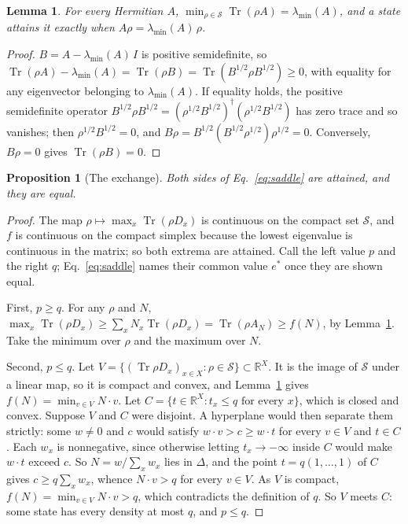 \documentclass[aps,prd,reprint,superscriptaddress]{revtex4-2}
\newtheorem{proposition}{Proposition}
\newtheorem{lemma}{Lemma}
\begin{document}
\begin{lemma}\label{lem:lowest}
For every Hermitian $A$, $\min_{\rho\in\mathcal S}\operatorname{Tr}(\rho A) = \lambda_{\min}(A)$, and a state attains it exactly when $A\rho = \lambda_{\min}(A)\,\rho$.
\end{lemma}
\begin{proof}
$B = A - \lambda_{\min}(A)\,I$ is positive semidefinite, so $\operatorname{Tr}(\rho A) - \lambda_{\min}(A) = \operatorname{Tr}(\rho B) = \operatorname{Tr}(B^{1/2}\rho B^{1/2}) \ge 0$, with equality for any eigenvector belonging to $\lambda_{\min}(A)$. If equality holds, the positive semidefinite operator $B^{1/2}\rho B^{1/2} = (\rho^{1/2}B^{1/2})^\dagger(\rho^{1/2}B^{1/2})$ has zero trace and so vanishes; then $\rho^{1/2}B^{1/2} = 0$, and $B\rho = B^{1/2}(B^{1/2}\rho^{1/2})\rho^{1/2} = 0$. Conversely, $B\rho = 0$ gives $\operatorname{Tr}(\rho B) = 0$.
\end{proof}

\begin{proposition}[The exchange]\label{prop:exchange}
Both sides of Eq.~\eqref{eq:saddle} are attained, and they are equal.
\end{proposition}
\begin{proof}
The map $\rho \mapsto \max_x \operatorname{Tr}(\rho D_x)$ is continuous on the compact set $\mathcal S$, and $f$ is continuous on the compact simplex because the lowest eigenvalue is continuous in the matrix; so both extrema are attained. Call the left value $p$ and the right $q$; Eq.~\eqref{eq:saddle} names their common value $e^*$ once they are shown equal.

First, $p \ge q$. For any $\rho$ and $N$, $\max_x \operatorname{Tr}(\rho D_x) \ge \sum_x N_x \operatorname{Tr}(\rho D_x) = \operatorname{Tr}(\rho A_N) \ge f(N)$, by Lemma~\ref{lem:lowest}. Take the minimum over $\rho$ and the maximum over $N$.

Second, $p \le q$. Let $V = \{(\operatorname{Tr}\rho D_x)_{x\in X} : \rho \in \mathcal S\} \subset \mathbb R^X$. It is the image of $\mathcal S$ under a linear map, so it is compact and convex, and Lemma~\ref{lem:lowest} gives $f(N) = \min_{v \in V} N\cdot v$. Let $C = \{t \in \mathbb R^X : t_x \le q \text{ for every } x\}$, which is closed and convex. Suppose $V$ and $C$ were disjoint. A hyperplane would then separate them strictly: some $w \ne 0$ and $c$ would satisfy $w\cdot v > c \ge w\cdot t$ for every $v \in V$ and $t \in C$. Each $w_x$ is nonnegative, since otherwise letting $t_x \to -\infty$ inside $C$ would make $w\cdot t$ exceed $c$. So $N = w/\sum_x w_x$ lies in $\Delta$, and the point $t = q(1,\dots,1)$ of $C$ gives $c \ge q\sum_x w_x$, whence $N\cdot v > q$ for every $v \in V$. As $V$ is compact, $f(N) = \min_{v\in V} N\cdot v > q$, which contradicts the definition of $q$. So $V$ meets $C$: some state has every density at most $q$, and $p \le q$.
\end{proof}
\end{document}
